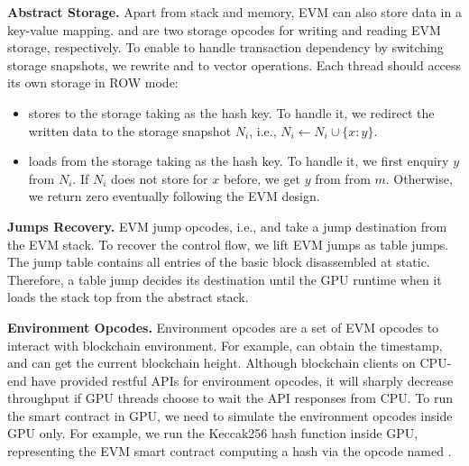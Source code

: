\noindent\textbf{Abstract Storage.}
Apart from stack and memory, EVM can also store data in a key-value mapping. 
 and  are two storage opcodes for writing and reading EVM storage, respectively.
To enable {\tool} to handle transaction dependency by switching storage snapshots, we rewrite  and  to vector operations. Each thread should access its own storage in ROW mode:
%
\begin{itemize}
    \item {} stores  to the storage taking  as the hash key. To handle it, we redirect the written data to the storage snapshot $N_i$, i.e., $N_{i} \gets N_{i} \cup \{x:y\}$.
    
    \item {} loads  from the storage taking  as the hash key. To handle it, we first enquiry $y$ from $N_i$. If $N_i$ does not store for $x$ before, we get $y$ from from $m$. Otherwise, we return zero eventually following the EVM design.
\end{itemize}

\noindent\textbf{Jumps Recovery.}
EVM jump opcodes, i.e.,  and  take a jump destination from the EVM stack. 
To recover the control flow, we lift EVM jumps as table jumps. 
The jump table contains all entries of the basic block disassembled at static.
Therefore, a table jump decides its destination until the GPU runtime when it loads the stack top from the abstract stack.


\noindent\textbf{Environment Opcodes.}
Environment opcodes are a set of EVM opcodes to interact with blockchain environment\cite{evm2021opcodes}.
For example,  can obtain the timestamp, and  can get the current blockchain height. 
%
Although blockchain clients on CPU-end have provided restful APIs for environment opcodes, it will sharply decrease {\tool} throughput if GPU threads choose to wait the API responses from CPU.
%
To run the smart contract in GPU, we need to simulate the environment opcodes inside GPU only.
For example, we run the Keccak256\cite{bertoni2013keccak} hash function inside GPU, representing the EVM smart contract computing a hash via the opcode named .


